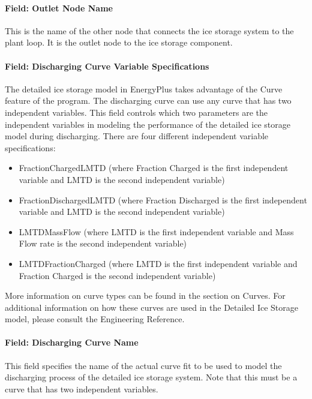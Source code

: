 \paragraph{Field: Outlet Node Name}\label{field-outlet-node-name-1-002}

This is the name of the other node that connects the ice storage system to the plant loop. It is the outlet node to the ice storage component.

\paragraph{Field: Discharging Curve Variable Specifications}\label{field-discharging-curve-variable-specifications}

The detailed ice storage model in EnergyPlus takes advantage of the Curve feature of the program.  The discharging curve can use any curve that has two independent variables.  This field controls which two parameters are the independent variables in modeling the performance of the detailed ice storage model during discharging. There are four different independent variable specifications:

\begin{itemize}
\item
FractionChargedLMTD (where Fraction Charged is the first independent variable and LMTD is the second independent variable)
\item
FractionDischargedLMTD (where Fraction Discharged is the first independent variable and LMTD is the second independent variable)
\item
LMTDMassFlow (where LMTD is the first independent variable and Mass Flow rate is the second independent variable)
\item
LMTDFractionCharged (where LMTD is the first independent variable and Fraction Charged is the second independent variable)
\end{itemize}

More information on curve types can be found in the section on Curves.  For additional information on how these curves are used in the Detailed Ice Storage model, please consult the Engineering Reference.

\paragraph{Field: Discharging Curve Name}\label{field-discharging-curve-name}

This field specifies the name of the actual curve fit to be used to model the discharging process of the detailed ice storage system. Note that this must be a curve that has two independent variables.

